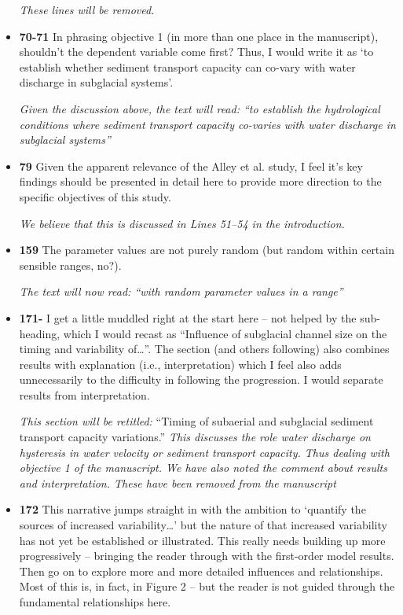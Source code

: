 \documentclass[11pt]{article}
\begin{document}
\begin{itemize}
  \textit{These lines will be removed.}

\item \textbf{70-71} In phrasing objective 1 (in more than one place in the manuscript),
  shouldn’t the dependent variable come first? Thus, I would write it as ‘to
  establish whether sediment transport capacity can co-vary with water
  discharge in subglacial systems’.

  \textit{Given the discussion above, the text will read: ``to establish the hydrological conditions where  sediment transport capacity co-varies with water discharge in subglacial systems''}
  
\item \textbf{79} Given the apparent relevance of the Alley et al. study, I feel it’s key findings
  should be presented in detail here to provide more direction to the specific
  objectives of this study.

  \textit{ We believe that this is discussed in Lines 51--54 in the introduction.}


  
\item \textbf{159} The parameter values are not purely random (but random within certain
  sensible ranges, no?).

  \textit{The text will now read: ``with random parameter values in a range''}

\item \textbf{171-} I get a little muddled right at the start here – not helped by the sub-heading,
  which I would recast as “Influence of subglacial channel size on the timing
  and variability of…”. The section (and others following) also combines
  results with explanation (i.e., interpretation) which I feel also adds
  unnecessarily to the difficulty in following the progression. I would separate
  results from interpretation.

  \textit{This section will be retitled:} ``Timing of subaerial and subglacial sediment transport capacity variations.''
  \textit{This discusses the role water discharge on hysteresis in water velocity or sediment transport capacity. Thus dealing with objective 1 of the manuscript. We have also noted the comment about results and interpretation. These have been removed from the manuscript}
  

\item \textbf{172} This narrative jumps straight in with the ambition to ‘quantify the sources
  of increased variability…’ but the nature of that increased variability has not
  yet be established or illustrated. This really needs building up more
  progressively – bringing the reader through with the first-order model
  results. Then go on to explore more and more detailed influences and
  relationships. Most of this is, in fact, in Figure 2 – but the reader is not
  guided through the fundamental relationships here.


\end{itemize}
\end{document}
